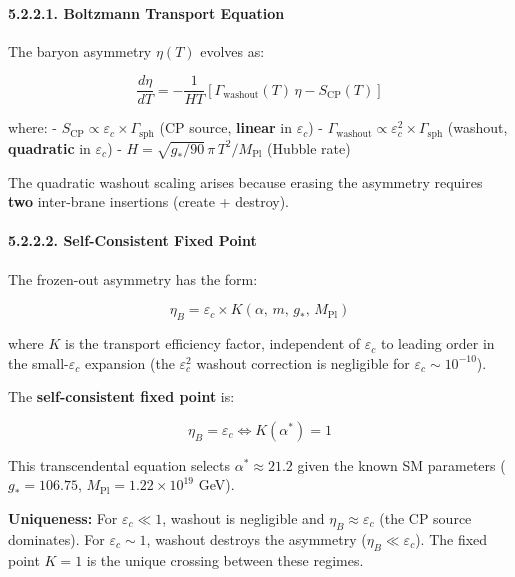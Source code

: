 \documentclass[
  11pt,
]{article}
\begin{document}
\hypertarget{boltzmann-transport-equation}{%
\paragraph{5.2.2.1. Boltzmann Transport
Equation}\label{boltzmann-transport-equation}}

The baryon asymmetry \(\eta(T)\) evolves as:

\[\frac{d\eta}{dT} = -\frac{1}{HT}\left[\Gamma_{\text{washout}}(T)\,\eta - S_{\text{CP}}(T)\right] \tag{214}\]

where: -
\(S_{\text{CP}} \propto \varepsilon_c \times \Gamma_{\text{sph}}\) (CP
source, \textbf{linear} in \(\varepsilon_c\)) -
\(\Gamma_{\text{washout}} \propto \varepsilon_c^2 \times \Gamma_{\text{sph}}\)
(washout, \textbf{quadratic} in \(\varepsilon_c\)) -
\(H = \sqrt{g_*/90}\,\pi\,T^2/M_{\text{Pl}}\) (Hubble rate)

The quadratic washout scaling arises because erasing the asymmetry
requires \textbf{two} inter-brane insertions (create + destroy).

\hypertarget{self-consistent-fixed-point}{%
\paragraph{5.2.2.2. Self-Consistent Fixed
Point}\label{self-consistent-fixed-point}}

The frozen-out asymmetry has the form:

\[\eta_B = \varepsilon_c \times K(\alpha,\, m,\, g_*,\, M_{\text{Pl}}) \tag{215}\]

where \(K\) is the transport efficiency factor, independent of
\(\varepsilon_c\) to leading order in the small-\(\varepsilon_c\)
expansion (the \(\varepsilon_c^2\) washout correction is negligible for
\(\varepsilon_c \sim 10^{-10}\)).

The \textbf{self-consistent fixed point} is:

\[\boxed{\eta_B = \varepsilon_c \iff K(\alpha^*) = 1} \tag{216}\]

This transcendental equation selects \(\alpha^* \approx 21.2\) given the
known SM parameters (\(g_* = 106.75\),
\(M_{\text{Pl}} = 1.22 \times 10^{19}\) GeV).

\textbf{Uniqueness:} For \(\varepsilon_c \ll 1\), washout is negligible
and \(\eta_B \approx \varepsilon_c\) (the CP source dominates). For
\(\varepsilon_c \sim 1\), washout destroys the asymmetry
(\(\eta_B \ll \varepsilon_c\)). The fixed point \(K = 1\) is the unique
crossing between these regimes.
\end{document}
